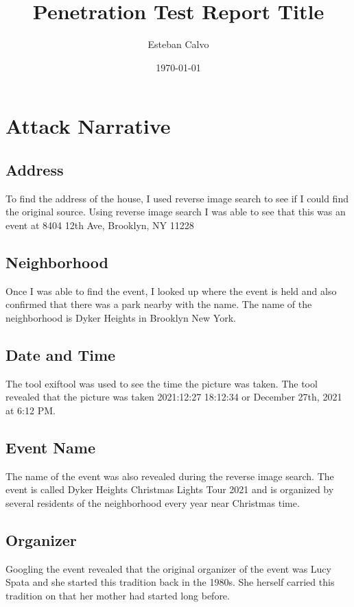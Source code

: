 \documentclass[notitlepage]{article}
\begin{document}
  
\title{Penetration Test Report Title}
\author{Esteban Calvo}
\date{\isodate\today}

\maketitle

\tableofcontents

\newpage


\section{Attack Narrative}

\subsection{Address}
To find the address of the house, I used reverse image search to see if I could find the original source. Using reverse image search I was able to see that this was an event at 8404 12th Ave, Brooklyn, NY 11228
\subsection{Neighborhood}
Once I was able to find the event, I looked up where the event is held and also confirmed that there was a park nearby with the name. The name of the neighborhood is Dyker Heights in Brooklyn New York.

\subsection{Date and Time}
The tool exiftool was used to see the time the picture was taken. The tool revealed that the picture was taken 2021:12:27 18:12:34 or December 27th, 2021 at 6:12 PM.

\subsection{Event Name}
The name of the event was also revealed during the reverse image search. The event is called Dyker Heights Christmas Lights Tour 2021 and is organized by several residents of the neighborhood every year near Christmas time. 
\subsection{Organizer}
Googling the event revealed that the original organizer of the event was Lucy Spata and she started this tradition back in the 1980s. She herself carried this tradition on that her mother had started long before. 
	
\end{document}
